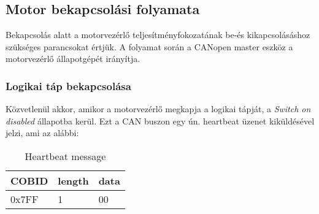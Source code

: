 \subsection{Motor bekapcsolási folyamata}\label{setting-motion-on-gold-twitter}

Bekapcsolás alatt a motorvezérlő teljesítményfokozatának be-és kikapcsolásáshoz szükséges parancsokat értjük. A folyamat során a CANopen master eszköz a motorvezérlő állapotgépét irányítja.






\subsubsection{Logikai táp bekapcsolása}\label{after-turn-on}

Közvetlenül akkor, amikor a motorvezérlő megkapja a logikai tápját, a \textit{Switch on disabled} állapotba kerül. Ezt a CAN buszon egy ún. heartbeat üzenet kiküldésével jelzi, ami az alábbi:

\begin{table}[H]
	\centering
	\renewcommand{\arraystretch}{2} %
	
	\begin{tabu}{|p{1.3cm}|p{1cm}|p{1.2cm}|}
		\hline
		COBID & length & data
		\\ 		\hline
		0x7FF & 1 & 00
		\\		\hline
	\end{tabu}
	\caption*{Heartbeat message}
\end{table}


